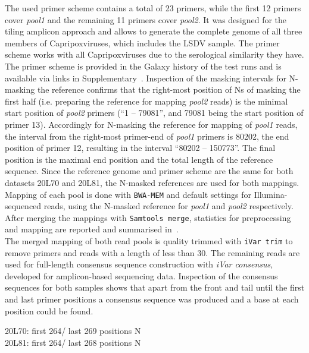 The used primer scheme contains a total of 23 primers, while the first 12 primers cover \textit{pool1} and the remaining 11 primers cover \textit{pool2}. It was designed for the tiling amplicon approach and allows to generate the complete genome of all three members of Capripoxviruses, which includes the \ac{LSDV} sample. The primer scheme works with all Capripoxviruses due to the serological similarity they have. The primer scheme is provided in the Galaxy history of the test runs and is available via links in Supplementary~. Inspection of the masking intervals for N-masking the reference confirms that the right-most position of Ns of masking the first half (i.e. preparing the reference for mapping \textit{pool2} reads) is the minimal start position of \textit{pool2} primers (``1 -- 79081'', and 79081 being the start position of primer 13). Accordingly for N-masking the reference for mapping of \textit{pool1} reads, the interval from the right-most primer-end of \textit{pool1} primers is 80202, the end position of primer 12, resulting in the interval ``80202 -- 150773''. The final position is the maximal end position and the total length of the reference sequence. Since the reference genome and primer scheme are the same for both datasets 20L70 and 20L81, the N-masked references are used for both mappings. Mapping of each pool is done with \texttt{BWA-MEM} and default settings for Illumina-sequenced reads, using the N-masked reference for \textit{pool1} and \textit{pool2} respectively. After merging the mappings with \texttt{Samtools merge}, statistics for preprocessing and mapping are reported and summarised in~. \\
The merged mapping of both read pools is quality trimmed with \texttt{iVar trim} to remove primers and reads with a length of less than 30. The remaining reads are used for full-length consensus sequence construction with \textit{iVar consensus}, developed for amplicon-based sequencing data. Inspection of the consensus sequences for both samples shows that apart from the front and tail until the first and last primer positions a consensus sequence was produced and a base at each position could be found. 

20L70: first 264/ last 269 positions N \\
20L81: first 264/ last 268 positions N



